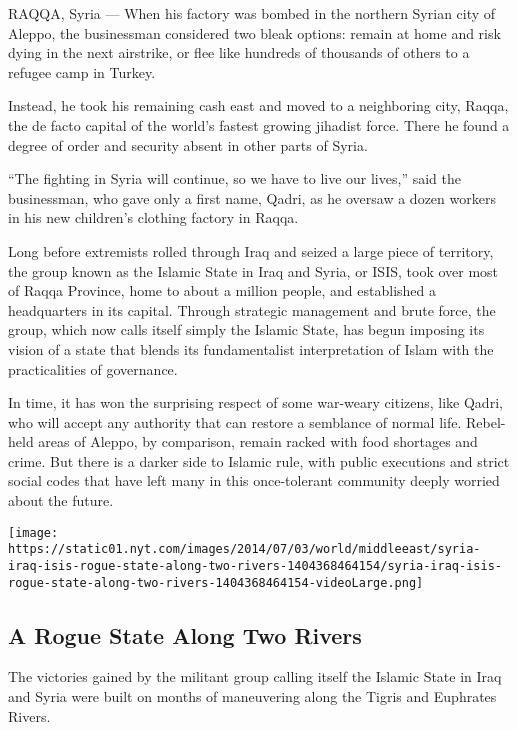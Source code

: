 RAQQA, Syria --- When his factory was bombed in the northern Syrian city
of Aleppo, the businessman considered two bleak options: remain at home
and risk dying in the next airstrike, or flee like hundreds of thousands
of others to a refugee camp in Turkey.

Instead, he took his remaining cash east and moved to a neighboring
city, Raqqa, the de facto capital of the world's fastest growing
jihadist force. There he found a degree of order and security absent in
other parts of Syria.

``The fighting in Syria will continue, so we have to live our lives,''
said the businessman, who gave only a first name, Qadri, as he oversaw a
dozen workers in his new children's clothing factory in Raqqa.

Long before extremists rolled through Iraq and seized a large piece of
territory, the group known as the Islamic State in Iraq and Syria, or
ISIS, took over most of Raqqa Province, home to about a million people,
and established a headquarters in its capital. Through strategic
management and brute force, the group, which now calls itself simply the
Islamic State, has begun imposing its vision of a state that blends its
fundamentalist interpretation of Islam with the practicalities of
governance.

In time, it has won the surprising respect of some war-weary citizens,
like Qadri, who will accept any authority that can restore a semblance
of normal life. Rebel-held areas of Aleppo, by comparison, remain racked
with food shortages and crime. But there is a darker side to Islamic
rule, with public executions and strict social codes that have left many
in this once-tolerant community deeply worried about the future.

\href{https://www.nytimes.com/interactive/2014/07/03/world/middleeast/syria-iraq-isis-rogue-state-along-two-rivers.html}{}

\texttt{[image: https://static01.nyt.com/images/2014/07/03/world/middleeast/syria-iraq-isis-rogue-state-along-two-rivers-1404368464154/syria-iraq-isis-rogue-state-along-two-rivers-1404368464154-videoLarge.png]}

\hypertarget{a-rogue-state-along-two-rivers}{%
\subsection{A Rogue State Along Two
Rivers}\label{a-rogue-state-along-two-rivers}}

The victories gained by the militant group calling itself the Islamic
State in Iraq and Syria were built on months of maneuvering along the
Tigris and Euphrates Rivers.

